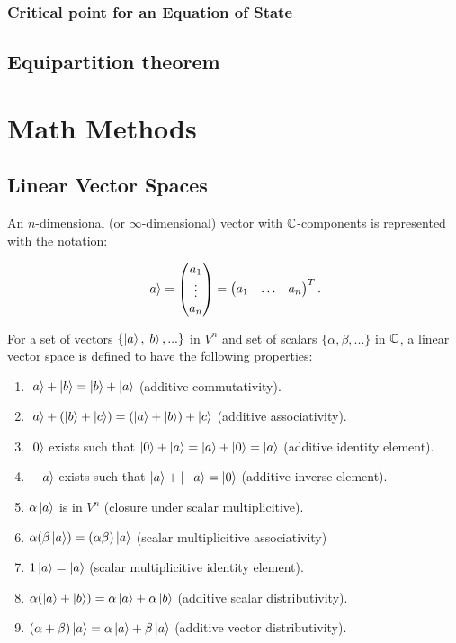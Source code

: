 \documentclass[]{article}
\begin{document}
\subsubsection{Critical point for an Equation of State}

\subsection{Equipartition theorem}


\pagebreak
\section{Math Methods}
\subsection{Linear Vector Spaces}

An $n$-dimensional (or $\infty$-dimensional) vector with $\Bbb{C}$-components is represented with the notation: 

\[ \ket{a} = \left(\begin{matrix} a_1 \\ \vdots \\ a_n \end{matrix}\right) = \begin{pmatrix} a_1 & \ldots & a_n \end{pmatrix}^T. \]

For a set of vectors $\{ \ket{a},\ket{b},...\} $ in $V^n$ and set of scalars $\{ \alpha, \beta, ... \}$ in $\Bbb{C}$, a linear vector space is defined to have the following properties:

\begin{enumerate}
    \item $\ket{a}+\ket{b} = \ket{b}+\ket{a}$ (additive commutativity).
    \item $\ket{a}+(\ket{b}+\ket{c})=(\ket{a}+\ket{b})+\ket{c}$ (additive associativity).
    \item $\ket{0}$ exists such that $\ket{0} + \ket{a} = \ket{a} + \ket{0} = \ket{a}$ (additive identity element).
    \item $\ket{-a}$ exists such that $\ket{a}+\ket{-a}=\ket{0}$ (additive inverse element).
    \item $\alpha \ket{a}$ is in $V^n$ (closure under scalar multiplicitive).
    \item $\alpha (\beta \ket{a}) = (\alpha \beta) \ket{a}$ (scalar multiplicitive associativity)
    \item $1 \ket{a} = \ket{a}$ (scalar multiplicitive identity element).
    \item $\alpha (\ket{a}+\ket{b})=\alpha \ket{a}+\alpha \ket{b}$ (additive scalar distributivity).
    \item $(\alpha + \beta)\ket{a}= \alpha \ket{a}+\beta \ket{a}$ (additive vector distributivity).
    
\end{enumerate}
\end{document}
